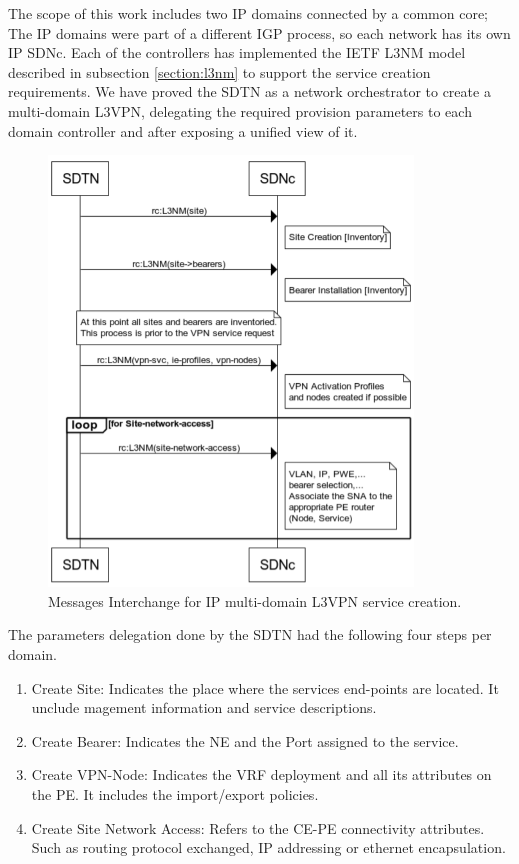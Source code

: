 \documentclass[10pt, conference]{IEEEtran}
\begin{document}
The scope of this work includes two IP domains connected by a common core; The IP domains were part of a different IGP process, so each network has its own IP SDNc. Each of the controllers has implemented the IETF L3NM model described in subsection \ref{section:l3nm} to support the service creation requirements. We have proved the SDTN as a network orchestrator to create a multi-domain L3VPN, delegating the required provision parameters to each domain controller and after exposing a unified view of it.

\begin{figure}
	\centering
		\includegraphics[scale=0.65]{figs/diagram-9.png}
	\caption{Messages Interchange for IP multi-domain L3VPN service creation.}
	\label{FIG:l3vpn_workflow}
\end{figure}

The parameters delegation done by the SDTN had the following four steps per domain.
\begin{enumerate}
    \item Create Site: Indicates the place where the services end-points are located. It unclude magement information and service descriptions. 
    \item Create Bearer: Indicates the NE and the Port assigned to the service.
    \item Create VPN-Node: Indicates the VRF deployment and all its attributes on the PE. It includes the import/export policies.
    \item Create Site Network Access: Refers to the CE-PE connectivity attributes. Such as routing protocol exchanged, IP addressing or ethernet encapsulation. 
\end{enumerate}
\end{document}
